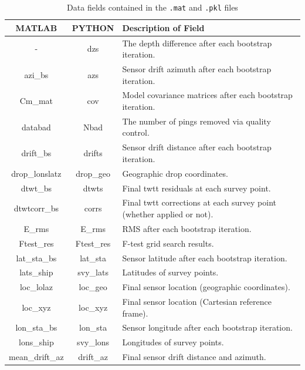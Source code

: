 \documentclass[titlepage, 12pt]{article}
\begin{document}
  \begin{table}[!htb]
   \centering
   \caption{Data fields contained in the \texttt{.mat} and \texttt{.pkl} files}
   \label{table:dict}
   \begin{tabularx}{\linewidth}{|c|c|X|}
    \hline
    \textbf{MATLAB} & \textbf{PYTHON} & \textbf{Description of Field} \\ \hline
    -               & dzs        & The depth difference after each bootstrap iteration. \\ \hline
    azi\_bs         & azs        & Sensor drift azimuth after each bootstrap iteration. \\ \hline
    Cm\_mat         & cov        & Model covariance matrices after each bootstrap iteration. \\ \hline
    databad         & Nbad       & The number of pings removed via quality control. \\ \hline
    drift\_bs       & drifts     & Sensor drift distance after each bootstrap iteration. \\ \hline
    drop\_lonslatz  & drop\_geo  & Geographic drop coordinates. \\ \hline
    dtwt\_bs        & dtwts      & Final twtt residuals at each survey point. \\ \hline
    dtwtcorr\_bs    & corrs      & Final twtt corrections at each survey point (whether applied or not). \\ \hline
    E\_rms          & E\_rms     & RMS after each bootstrap iteration. \\ \hline
    Ftest\_res      & Ftest\_res & F-test grid search results. \\ \hline
    lat\_sta\_bs    & lat\_sta   & Sensor latitude after each bootstrap iteration. \\ \hline
    lats\_ship      & svy\_lats  & Latitudes of survey points. \\ \hline
    loc\_lolaz      & loc\_geo   & Final sensor location (geographic coordinates). \\ \hline
    loc\_xyz        & loc\_xyz   & Final sensor location (Cartesian reference frame). \\ \hline
    lon\_sta\_bs    & lon\_sta   & Sensor longitude after each bootstrap iteration. \\ \hline
    lons\_ship      & svy\_lons  & Longitudes of survey points. \\ \hline
    mean\_drift\_az & drift\_az  & Final sensor drift distance and azimuth. \\ \hline

\end{tabularx}
\end{table}
\end{document}
